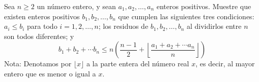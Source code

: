 Sea $n \geq 2$ un número entero, y sean $a_1, a_2, \dots , a_n$ enteros positivos. Muestre que
existen enteros positivos $b_1, b_2, \dots , b_n$ que cumplen las siguientes tres condiciones: $a_i \le b_i$ para todo $i = 1, 2, \dots , n$; los residuos de $b_1, b_2, \dots , b_n$ al dividirlos entre $n$ son todos diferentes; y
\[b_1+b_2+\cdots b_n \le n\left(\frac{n-1}{2}+\left\lfloor \frac{a_1+a_2+\cdots a_n}{n}\right \rfloor \right)\]
Nota: Denotamos por $\lfloor x\rfloor$ a la parte entera del número real $x$, es decir, al mayor entero que es menor
o igual a $x$.